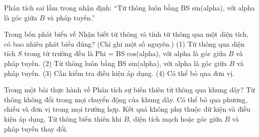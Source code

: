 \begin{bt}
Phân tích sai lầm trong nhận định: “Từ thông luôn bằng BS sin(alpha), với alpha là góc giữa $B$ và pháp tuyến.”
\end{bt}

\begin{ex}
Trong bốn phát biểu về Nhận biết từ thông và tính từ thông qua một diện tích, có bao nhiêu phát biểu đúng? (Chỉ ghi một số nguyên.) (1) Từ thông qua diện tích $S$ trong từ trường đều là Phi = BS cos(alpha), với alpha là góc giữa $B$ và pháp tuyến. (2) Từ thông luôn bằng BS sin(alpha), với alpha là góc giữa $B$ và pháp tuyến. (3) Cần kiểm tra điều kiện áp dụng. (4) Có thể bỏ qua đơn vị.
\end{ex}

\begin{ex}
Trong một bài thực hành về Phân tích sự biến thiên từ thông qua khung dây?
\choice
{Từ thông không đổi trong mọi chuyển động của khung dây.}
{Có thể bỏ qua phương, chiều và đơn vị trong mọi trường hợp.}
{Kết quả không phụ thuộc dữ kiện và điều kiện áp dụng.}
{\True Từ thông biến thiên khi $B$, diện tích mạch hoặc góc giữa $B$ và pháp tuyến thay đổi.}
\end{ex}

